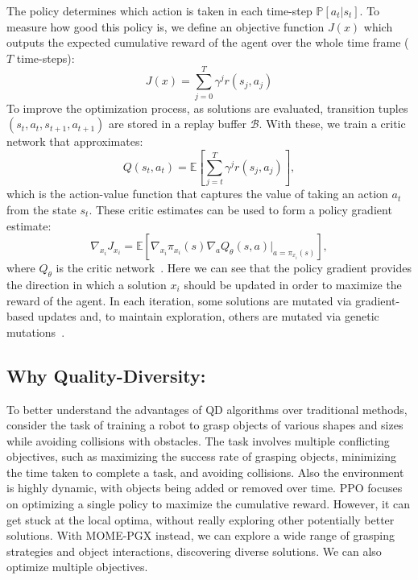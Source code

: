 \documentclass[12pt]{article}
\begin{document}
The policy determines which action is taken in each time-step $\mathbb{P}\left[a_{t}|s_{t} \right]$. To measure how good this policy is, we define an objective function $J(x)$ which outputs the expected cumulative reward of the agent over the whole time frame ($T$ time-steps):
\[
J(x)=\sum_{j=0}^{T} \gamma^{j}r(s_{j}, a_{j})
\]
To improve the optimization process, as solutions are evaluated, transition tuples $(s_{t}, a_{t}, s_{t+1}, a_{t+1})$ are stored in a replay buffer $\mathcal{B}$. With these, we train a critic network that approximates:
\[
Q(s_{t}, a_{t})=\mathbb{E}\left[ \sum_{j=t}^{T} \gamma^{j}r(s_{j}, a_{j})\right],
\] 
which is the action-value function that captures the value of taking an action $a_{t}$ from the state $s_{t}$.
These critic estimates can be used to form a policy gradient estimate:
\[
\nabla_{x_{i}}J_{x_{i}}=\mathbb{E}\left[ \nabla_{x_{i}}\pi_{x_{i}}(s)\nabla_{a}Q_{\theta}(s, a)|_{a=\pi_{x_{i}}(s)}\right],
\] 
where $Q_{\theta}$ is the critic network~\cite{Tsou_2021}. Here we can see that the policy gradient provides the direction in which a solution $x_{i}$ should be updated in order to maximize the reward of the agent. 
In each iteration, some solutions are mutated via gradient-based updates and, to maintain exploration, others are mutated via genetic mutations~\cite{Janmohamed_2023}. \\

\subsection{Why Quality-Diversity:}
To better understand the advantages of QD algorithms over traditional methods, consider the task of training a robot to grasp objects of various shapes and sizes while avoiding collisions with obstacles. The task involves multiple conflicting objectives, such as maximizing the success rate of grasping objects, minimizing the time taken to complete a task, and avoiding collisions. Also the environment is highly dynamic, with objects being added or removed over time. PPO focuses on optimizing a single policy to maximize the cumulative reward. However, it can get stuck at the local optima, without really exploring other potentially better solutions. With MOME-PGX instead, we can explore a wide range of grasping strategies and object interactions, discovering diverse solutions. We can also optimize multiple objectives. 

{}

\end{document}
